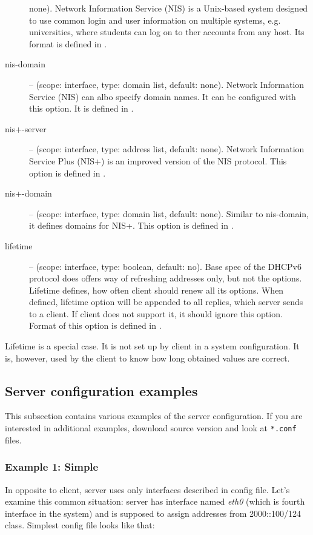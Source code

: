 \begin{description}
	    none). Network Information Service (NIS) is a Unix-based
	    system designed to use common login and user information on
	    multiple systems, e.g. universities, where students can log
	    on to ther accounts from any host. Its format is defined
            in \cite{rfc3898}.
 \item[nis-domain] -- (scope: interface, type: domain list, default:
	    none). Network Information Service (NIS) can albo specify
	    domain names. It can be configured with this option. It is
	    defined in \cite{rfc3898}.
 \item[nis+-server] -- (scope: interface, type: address list, default:
	    none). Network Information Service Plus (NIS+) is an
	    improved version of the NIS protocol. This option is defined
	    in \cite{rfc3898}.
 \item[nis+-domain] -- (scope: interface, type: domain list, default:
	    none). Similar to nis-domain, it defines domains for
	    NIS+. This option is defined in \cite{rfc3898}.
 \item[lifetime] -- (scope: interface, type: boolean, default: no). Base
	    spec of the DHCPv6 protocol does offers way of refreshing
	    addresses only, but not the options. Lifetime defines, how
	    often client should renew all its options. When defined,
            lifetime option will be appended to all replies, which
            server sends to a client. If client does not support it,
            it should ignore this option. Format of
	    this option is defined in \cite{draft-lifetime}.
\end{description}

Lifetime is a special case. It is not set up by client in a system
configuration. It is, however, used by the client to know how long
obtained values are correct.

\subsection{Server configuration examples}

This subsection contains various examples of the server
configuration. If you are interested in additional examples, download source version
and look at \verb+*.conf+ files.


\subsubsection{Example 1: Simple}

In opposite to client, server uses only interfaces described in config
file. Let's examine this common situation: server has interface
named \emph{eth0} (which is fourth interface in the system) and is
supposed to assign addresses from 2000::100/124 class. Simplest config
file looks like that:

